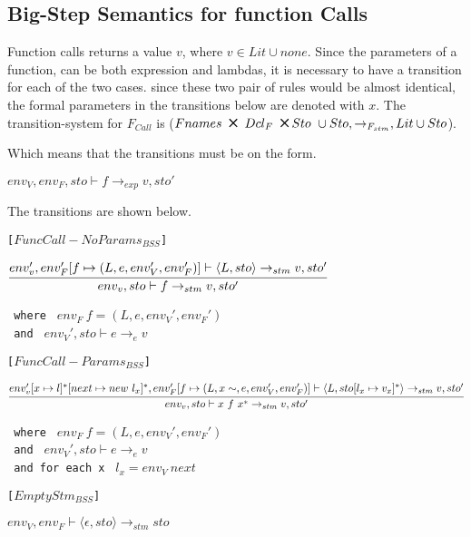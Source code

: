 \subsection{Big-Step Semantics for function Calls}
Function calls returns a value $v$, where $v \in Lit \cup {none}$.
Since the parameters of a function, can be both expression and lambdas, it is necessary to have a transition for each of the two cases.
since these two pair of rules would be almost identical, the formal parameters in the transitions below are denoted with $x$.
The transition-system for $F_{Call}$ is ($Fnames\ \Cross\ Dcl_F\ \Cross Sto\ \cup Sto, \rightarrow_{F_{stm}}, Lit \cup Sto$).

Which means that the transitions must be on the form.
\begin{center}
	$env_V, env_F, sto \vdash f \rightarrow_{exp} v, sto'$
\end{center}
The transitions are shown below.

\texttt{[$FuncCall-NoParams_{BSS}$]}\\
\begin{center}
	\begin{math}
	\cfrac
		{env_v', env_F'[f \mapsto (L, e, env_V', env_F')] \vdash \langle L, sto \rangle \rightarrow_{stm} v, sto'}
		{env_v, sto \vdash f \rightarrow_{stm} v, sto'}
	\end{math}
	
	\texttt{ where } $env_F\ f = (L, e, env_V', env_F')$\\
	\texttt{ and } $ env_V', sto \vdash e \rightarrow_{e} v$\\
\end{center}

\texttt{[$FuncCall-Params_{BSS}$]}\\
\begin{center}
	\begin{math}
	\cfrac
	{env_v'[x \mapsto l]^*[next \mapsto new\ l_x]^*, env_F'[f \mapsto (L, x\sim, e, env_V', env_F')] \vdash \langle L, sto[l_x \mapsto v_x]^* \rangle \rightarrow_{stm} v, sto'}
	{env_v, sto \vdash x\ f\ x^* \rightarrow_{stm} v, sto'}
	\end{math}
	
	\texttt{ where } $env_F\ f = (L, e, env_V', env_F')$\\
	\texttt{ and } $ env_V', sto \vdash e \rightarrow_{e} v$\\
	\texttt{ and for each x } $l_x = env_V\ next$ 
\end{center}

\texttt{[$EmptyStm_{BSS}$]}\\
\begin{center}
	\begin{math}
		{env_V, env_F \vdash \langle \epsilon, sto \rangle \rightarrow_{stm} sto}
	\end{math}
\end{center}

